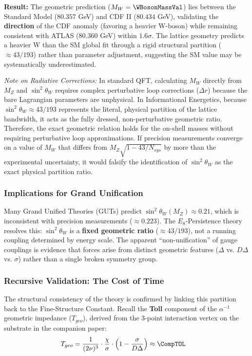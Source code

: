 \textbf{Result:} The geometric prediction ($M_W = \WBosonMassVal$) lies between the Standard Model ($80.357$ GeV) and CDF II ($80.434$ GeV), validating the \textbf{direction} of the CDF anomaly (favoring a heavier W-boson) while remaining consistent with ATLAS ($80.360$ GeV) within $1.6\sigma$. The lattice geometry predicts a heavier W than the SM global fit through a rigid structural partition ($\approx 43/193$) rather than parameter adjustment, suggesting the SM value may be systematically underestimated.

\textit{Note on Radiative Corrections:} In standard QFT, calculating $M_W$ directly from $M_Z$ and $\sin^2\theta_W$ requires complex perturbative loop corrections ($\Delta r$) because the bare Lagrangian parameters are unphysical. In Informational Energetics, because $\sin^2\theta_W \approx 43/193$ represents the literal, physical partition of the lattice bandwidth, it acts as the fully dressed, non-perturbative geometric ratio. Therefore, the exact geometric relation holds for the on-shell masses without requiring perturbative loop approximations. If precision measurements converge on a value of $M_W$ that differs from $M_Z\sqrt{1 - 43/N_{sys}}$ by more than the experimental uncertainty, it would falsify the identification of $\sin^2\theta_W$ as the exact physical partition ratio.

\subsubsection{Implications for Grand Unification}
Many Grand Unified Theories (GUTs) predict $\sin^2\theta_W(M_Z) \approx 0.21$, which is inconsistent with precision measurements ($\approx 0.223$). The $E_8$-Persistence theory resolves this: $\sin^2\theta_W$ is a \textbf{fixed geometric ratio} ($\approx 43/193$), not a running coupling determined by energy scale. The apparent ``non-unification'' of gauge couplings is evidence that forces arise from distinct geometric features ($\Delta$ vs. $D\Delta$ vs. $\sigma$) rather than a single broken symmetry group.

\subsubsection{Recursive Validation: The Cost of Time}
The structural consistency of the theory is confirmed by linking this partition back to the Fine-Structure Constant. Recall the \textbf{Toll} component of the $\alpha^{-1}$ geometric impedance ($T_{geo}$), derived from the 3-point interaction vertex on the substrate in the companion paper\cite{meyer_informational_2026}:
\begin{equation}
\begin{split}
    T_{geo} &= \frac{1}{(2\nu)^3} \cdot \frac{\chi}{\sigma} \cdot \left(1 - \frac{\sigma}{D\Delta} \right) \approx \CompTOL
\end{split}
\end{equation}

